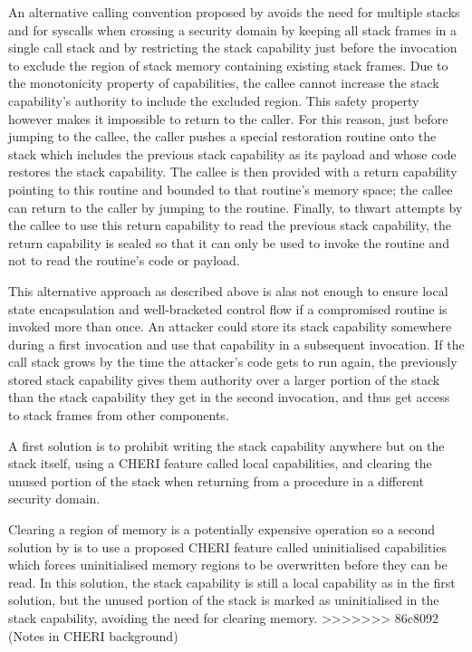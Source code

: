 \documentclass[main.tex]{subfiles}
\begin{document}
An alternative calling convention proposed by \cite{retptr} avoids the need for multiple stacks and for syscalls when crossing a security domain by keeping all stack frames in a single call stack and by restricting the stack capability just before the invocation to exclude the region of stack memory containing existing stack frames. Due to the monotonicity property of capabilities, the callee cannot increase the stack capability’s authority to include the excluded region. This safety property however makes it impossible to return to the caller. For this reason, just before jumping to the callee, the caller pushes a special restoration routine onto the stack which includes the previous stack capability as its payload and whose code restores the stack capability. The callee is then provided with a return capability pointing to this routine and bounded to that routine’s memory space; the callee can return to the caller by jumping to the routine. Finally, to thwart attempts by the callee to use this return capability to read the previous stack capability, the return capability is sealed so that it can only be used to invoke the routine and not to read the routine’s code or payload.

This alternative approach as described above is alas not enough to ensure local state encapsulation and well-bracketed control flow if a compromised routine is invoked more than once. An attacker could store its stack capability somewhere during a first invocation and use that capability in a subsequent invocation. If the call stack grows by the time the attacker’s code gets to run again, the previously stored stack capability gives them authority over a larger portion of the stack than the stack capability they get in the second invocation, and thus get access to stack frames from other components.

A first solution is to prohibit writing the stack capability anywhere but on the stack itself, using a CHERI feature called local capabilities, and clearing the unused portion of the stack when returning from a procedure in a different security domain.

Clearing a region of memory is a potentially expensive operation so a second solution by \cite{uninitcaps} is to use a proposed CHERI feature called uninitialised capabilities which forces uninitialised memory regions to be overwritten before they can be read. In this solution, the stack capability is still a local capability as in the first solution, but the unused portion of the stack is marked as uninitialised in the stack capability, avoiding the need for clearing memory.
>>>>>>> 86c8092 (Notes in CHERI background)

\biblio{}
\onlyinsubfile{\glsaddall\printglossaries}
\end{document}
